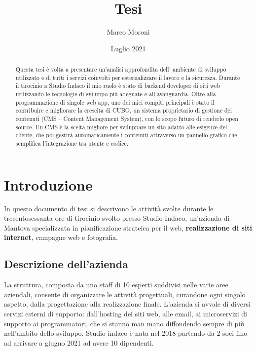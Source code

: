 \documentclass[12pt,a4paper]{article}
\title{Tesi}
\author{Marco Moroni }
\date{Luglio 2021}
\begin{document}
\maketitle
\clearpage
\clearpage
\begin{abstract}
\normalsize
Questa tesi è volta a presentare un’analisi approfondita dell' ambiente di sviluppo utilizzato e di tutti i servizi coinvolti per esternalizzare il lavoro e la sicurezza.
Durante il tirocinio a Studio Indaco il mio ruolo è stato di backend developer di siti web utilizzando le tecnologie di sviluppo più adeguate e all’avanguardia.
Oltre alla programmazione di singole web app, uno dei miei compiti principali è stato il contribuire e migliorare la crescita di CUBO, un sistema proprietario di gestione dei contenuti (CMS – Content Management System), con lo scopo futuro di renderlo open source. Un CMS è la scelta migliore per sviluppare un sito adatto alle esigenze del cliente, che poi gestirà automaticamente i contenuti attraverso un pannello grafico che semplifica l'integrazione tra utente e codice.

\end{abstract}
\clearpage
\tableofcontents{}
\clearpage

\section{Introduzione}
In questo documento di tesi si descrivono le attività svolte durante le trecentosessanta ore di tirocinio svolto presso Studio Indaco, un'azienda di Mantova specializzata in pianificazione strateica per il web, \textbf{realizzazione di siti internet}, campagne web e fotografia.
\subsection{Descrizione dell'azienda}
La struttura, composta da uno staff di 10 esperti suddivisi nelle varie aree aziendali, consente di organizzare le attività progettuali, curandone ogni singolo aspetto, dalla progettazione alla realizzazione finale.
L’azienda si avvale di diversi servizi esterni di supporto: dall’hosting dei siti web, alle email, ai microservizi di supporto ai programmatori, che si stanno man mano diffondendo sempre di più nell’ambito dello sviluppo.
Studio indaco è nata nel 2018 partendo da 2 soci fino ad arrivare a giugno 2021 ad avere 10 dipendenti.
\end{document}
